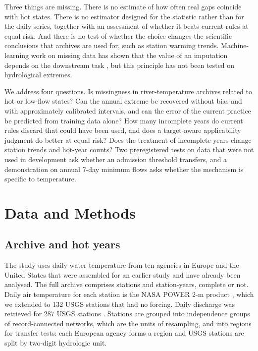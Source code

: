 \documentclass[draft]{agujournal2025}
\begin{document}
Three things are missing. There is no estimate of how often real gaps coincide with hot states. There is no estimator designed for the statistic rather than for the daily series, together with an assessment of whether it beats current rules at equal risk. And there is no test of whether the choice changes the scientific conclusions that archives are used for, such as station warming trends. Machine-learning work on missing data has shown that the value of an imputation depends on the downstream task \cite{lemorvan2021,shadbahr2023,wang2024imputation}, but this principle has not been tested on hydrological extremes.

We address four questions. Is missingness in river-temperature archives related to hot or low-flow states? Can the annual extreme be recovered without bias and with approximately calibrated intervals, and can the error of the current practice be predicted from training data alone? How many incomplete years do current rules discard that could have been used, and does a target-aware applicability judgment do better at equal risk? Does the treatment of incomplete years change station trends and hot-year counts? Two preregistered tests on data that were not used in development ask whether an admission threshold transfers, and a demonstration on annual 7-day minimum flows asks whether the mechanism is specific to temperature.

\section{Data and Methods}

\subsection{Archive and hot years}
The study uses daily water temperature from ten agencies in Europe and the United States that were assembled for an earlier study and have already been analysed. The full archive comprises \TArchiveStations{} stations and \TArchiveYears{} station-years, complete or not. Daily air temperature for each station is the NASA POWER 2-m product \cite{nasapower2026}, which we extended to 132 USGS stations that had no forcing. Daily discharge was retrieved for 287 USGS stations \cite{usgs2026}. Stations are grouped into independence groups of record-connected networks, which are the units of resampling, and into regions for transfer tests: each European agency forms a region and USGS stations are split by two-digit hydrologic unit.
\end{document}
